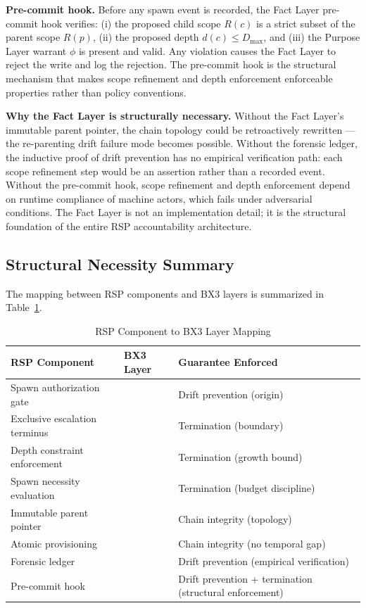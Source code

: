 \medskip
\noindent\textbf{Pre-commit hook.}
Before any spawn event is recorded, the Fact Layer pre-commit hook verifies: (i) the proposed child scope $R(c)$ is a strict subset of the parent scope $R(p)$, (ii) the proposed depth $d(c) \leq D_{\max}$, and (iii) the Purpose Layer warrant $\phi$ is present and valid. Any violation causes the Fact Layer to reject the write and log the rejection. The pre-commit hook is the structural mechanism that makes scope refinement and depth enforcement enforceable properties rather than policy conventions.

\medskip
\noindent\textbf{Why the Fact Layer is structurally necessary.}
Without the Fact Layer's immutable parent pointer, the chain topology could be retroactively rewritten — the re-parenting drift failure mode becomes possible. Without the forensic ledger, the inductive proof of drift prevention has no empirical verification path: each scope refinement step would be an assertion rather than a recorded event. Without the pre-commit hook, scope refinement and depth enforcement depend on runtime compliance of machine actors, which fails under adversarial conditions. The Fact Layer is not an implementation detail; it is the structural foundation of the entire RSP accountability architecture.

\subsection{Structural Necessity Summary}
\label{sec:integration-summary}

The mapping between RSP components and BX3 layers is summarized in Table~\ref{tab:rsp-bx3-mapping}.

\begin{table}[ht]
\centering
\caption{RSP Component to BX3 Layer Mapping}
\label{tab:rsp-bx3-mapping}
\begin{tabular}{lll}
\toprule
\textbf{RSP Component} & \textbf{BX3 Layer} & \textbf{Guarantee Enforced} \\
\midrule
Spawn authorization gate & \purpose{} & Drift prevention (origin) \\
Exclusive escalation terminus & \purpose{} & Termination (boundary) \\
Depth constraint enforcement & \bounds{} & Termination (growth bound) \\
Spawn necessity evaluation & \bounds{} & Termination (budget discipline) \\
Immutable parent pointer & \fact{} & Chain integrity (topology) \\
Atomic provisioning & \fact{} & Chain integrity (no temporal gap) \\
Forensic ledger & \fact{} & Drift prevention (empirical verification) \\
Pre-commit hook & \fact{} & Drift prevention + termination (structural enforcement) \\
\bottomrule
\end{tabular}
\end{table}

